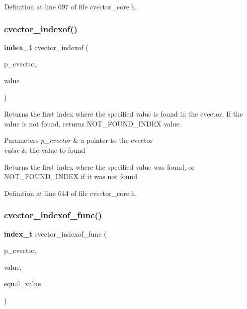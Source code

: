 Definition at line 697 of file cvector\+\_\+core.\+h.

\mbox{\label{cvector__interface_8h_aa11c7cb1423cfd6d9d41404188659f42}} 
\subsubsection{cvector\+\_\+indexof()}
{\footnotesize\ttfamily \textbf{ index\+\_\+t} cvector\+\_\+indexof (\begin{DoxyParamCaption}\item[{\textbf{ cvector} $\ast$}]{p\+\_\+cvector,  }\item[{\textbf{ value\+\_\+t}}]{value }\end{DoxyParamCaption})}

Returns the first index where the specified value is found in the cvector. If the value is not found, returns N\+O\+T\+\_\+\+F\+O\+U\+N\+D\+\_\+\+I\+N\+D\+EX value. 
\begin{DoxyParams}{Parameters}
{\em p\+\_\+cvector} & a pointer to the cvector \\
\hline
{\em value} & the value to found \\
\hline
\end{DoxyParams}
\begin{DoxyReturn}{Returns}
the first index where the specified value was found, or N\+O\+T\+\_\+\+F\+O\+U\+N\+D\+\_\+\+I\+N\+D\+EX if it was not found 
\end{DoxyReturn}


Definition at line 644 of file cvector\+\_\+core.\+h.

\mbox{\label{cvector__interface_8h_a4d82b0c6d906d0b979ecabd6073ca242}} 
\subsubsection{cvector\+\_\+indexof\+\_\+func()}
{\footnotesize\ttfamily \textbf{ index\+\_\+t} cvector\+\_\+indexof\+\_\+func (\begin{DoxyParamCaption}\item[{\textbf{ cvector} $\ast$}]{p\+\_\+cvector,  }\item[{\textbf{ value\+\_\+t}}]{value,  }\item[{bool($\ast$)(\textbf{ value\+\_\+t}, \textbf{ value\+\_\+t})}]{equal\+\_\+value }\end{DoxyParamCaption})}

